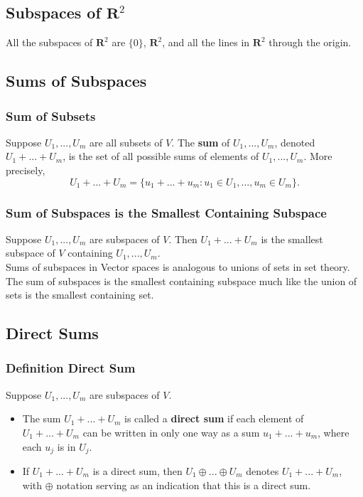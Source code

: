 \documentclass{article}
\begin{document}
	\subsection{Subspaces of $\mathbf{R}^2$}
	All the subspaces of $\mathbf{R}^2$ are $\{0\}$, $\mathbf{R}^2$, and all the lines in $\mathbf{R}^2$ through the origin.

	\subsection{Sums of Subspaces}
	\subsubsection{Sum of Subsets}
	Suppose $U_1, ..., U_m$ are all subsets of $V$. The \textbf{sum} of $U_1, ..., U_m$, denoted $U_1 + ... + U_m$, is the set of all possible sums of elements of $U_1, ..., U_m$. More precisely,
	\begin{equation*}
	U_1+...+U_m=\{u_1+...+u_m:u_1\in U_1, ..., u_m\in U_m\}.
	\end{equation*}

	\subsubsection{Sum of Subspaces is the Smallest Containing Subspace}
	Suppose $U_1,...,U_m$ are subspaces of $V$. Then $U_1+...+U_m$ is the smallest subspace of $V$ containing $U_1,...,U_m$.\\
	Sums of subspaces in Vector spaces is analogous to unions of sets in set theory. The sum of subspaces is the smallest containing subspace much like the union of sets is the smallest containing set.

	\subsection{Direct Sums}
	\subsubsection{Definition Direct Sum}
	Suppose $U_1,...,U_m$ are subspaces of $V$.
	\begin{itemize}
		\item The sum $U_1+...+U_m$ is called a \textbf{direct sum} if each element of $U_1+...+U_m$ can be written in only one way as a sum $u_1+...+u_m$, where each $u_j$ is in $U_j$.
		\item If $U_1+...+U_m$ is a direct sum, then $U_1\oplus...\oplus U_m$ denotes $U_1+...+U_m$, with $\oplus$ notation serving as an indication that this is a direct sum.
	\end{itemize}
\end{document}
